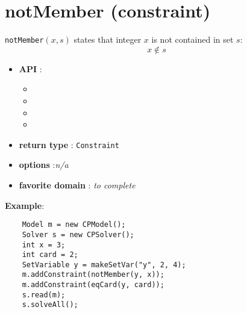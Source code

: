 \label{notmember}
\hypertarget{notmember}{}

\section{notMember (constraint)}\label{notmember:notmemberconstraint}\hypertarget{notmember:notmemberconstraint}{}
\begin{notedef}
\texttt{notMember}$(x,s)$ states that integer $x$ is not contained in set $s$:
$$x\not\in s$$  
\end{notedef}

\begin{itemize}
	\item \textbf{API} :
	\begin{itemize}
		\item {}
		\item {}
		\item {}
		\item {}
	\end{itemize}
	\item \textbf{return type} : \texttt{Constraint}
	\item \textbf{options} :\emph{n/a}
	\item \textbf{favorite domain} : \emph{to complete}
\end{itemize}

\textbf{Example}:
\begin{lstlisting}
	Model m = new CPModel();
	Solver s = new CPSolver();
	int x = 3;
	int card = 2;
	SetVariable y = makeSetVar("y", 2, 4);
	m.addConstraint(notMember(y, x));
	m.addConstraint(eqCard(y, card));
	s.read(m);
	s.solveAll();
\end{lstlisting} 
